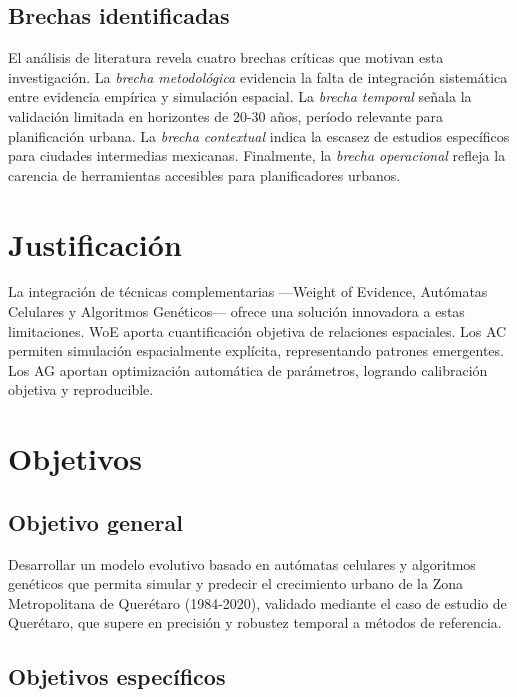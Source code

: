 \subsection{Brechas identificadas}

El análisis de literatura revela cuatro brechas críticas que motivan esta investigación. La \textit{brecha metodológica} evidencia la falta de integración sistemática entre evidencia empírica y simulación espacial. La \textit{brecha temporal} señala la validación limitada en horizontes de 20-30 años, período relevante para planificación urbana. La \textit{brecha contextual} indica la escasez de estudios específicos para ciudades intermedias mexicanas. Finalmente, la \textit{brecha operacional} refleja la carencia de herramientas accesibles para planificadores urbanos.

\section{Justificación}

La integración de técnicas complementarias —Weight of Evidence, Autómatas Celulares y Algoritmos Genéticos— ofrece una solución innovadora a estas limitaciones. WoE aporta cuantificación objetiva de relaciones espaciales. Los AC permiten simulación espacialmente explícita, representando patrones emergentes. Los AG aportan optimización automática de parámetros, logrando calibración objetiva y reproducible.

\section{Objetivos}

\subsection{Objetivo general}

Desarrollar un modelo evolutivo basado en autómatas celulares y algoritmos genéticos que permita simular y predecir el crecimiento urbano de la Zona Metropolitana de Querétaro (1984-2020), validado mediante el caso de estudio de Querétaro, que supere en precisión y robustez temporal a métodos de referencia.

\subsection{Objetivos específicos}


